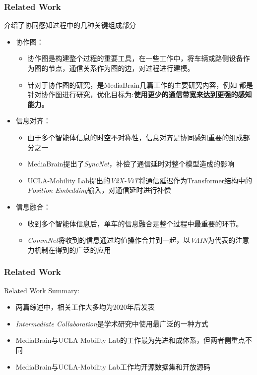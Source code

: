 \documentclass[8]{beamer}
\begin{document}
\begin{frame}[allowframebreaks]
    \frametitle{Related Work}
    \cite{ren2023collaborative}介绍了协同感知过程中的几种关键组成部分
    \begin{itemize}
        \item 协作图：
        \begin{itemize}
            \item 协作图是构建整个过程的重要工具，在一些工作中，将车辆或路侧设备作为图的节点，通信关系作为图的边，对过程进行建模。
            \item 针对于协作图的研究，是MediaBrain几篇工作的主要研究内容，例如\cite{wang2020v2vnet,li2021learning,liu2020who2com, liu2020when2com, hu_where2comm_2022}
            都是针对协作图进行研究，优化目标为:\textbf{使用更少的通信带宽来达到更强的感知能力。}
        \end{itemize}
        \item 信息对齐：
        \begin{itemize}
            \item 由于多个智能体信息的时空不对称性，信息对齐是协同感知重要的组成部分之一
            \item MediaBrain提出了\textit{SyncNet}\cite{lei2022latency}，补偿了通信延时对整个模型造成的影响
            \item UCLA-Mobility Lab提出的\textit{V2X-ViT}\cite{xu2022v2x}将通信延迟作为Transformer\cite{transformer}结构中的
            \textit{Position Embedding}输入，对通信延时进行补偿
        \end{itemize}
        \item 信息融合：
        \begin{itemize}
            \item 收到多个智能体信息后，单车的信息融合是整个过程中最重要的环节。
            \item \textit{CommNet}\cite{CommNet}将收到的信息通过均值操作合并到一起，以\textit{VAIN}\cite{VAIN}为代表的注意力机制在得到的广泛的应用
        \end{itemize}
    \end{itemize}
\end{frame}

\begin{frame}
    \frametitle{Related Work}
    Related Work Summary:
    \begin{itemize}
        \item \cite{ren2023collaborative,caillot2022survey}两篇综述中，相关工作大多均为2020年后发表
        \item \textit{Intermediate Collaboration}是学术研究中使用最广泛的一种方式
        \item MediaBrain与UCLA Mobility Lab的工作最为先进和成体系，但两者侧重点不同
        \item MediaBrain与UCLA-Mobility Lab工作均开源数据集和开放源码
    \end{itemize}
\end{frame}
\end{document}
